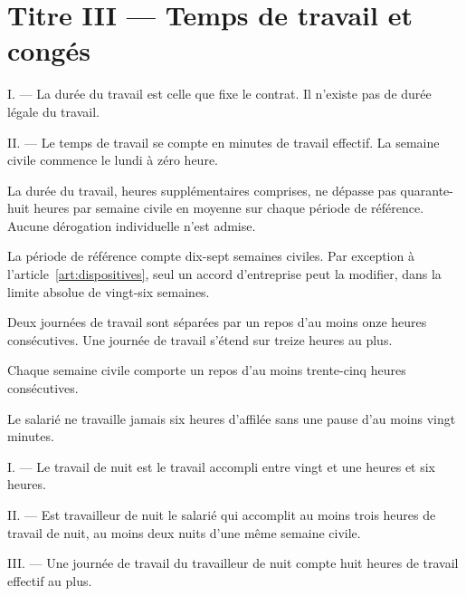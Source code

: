 \section{Titre III --- Temps de travail et congés}

\label{art:duree-travail}
I. --- La durée du travail est celle que fixe le contrat. Il n'existe pas de
durée légale du travail.

II. --- Le temps de travail se compte en minutes de travail effectif. La semaine
civile commence le lundi à zéro heure.

\label{art:duree-max}
La durée du travail, heures supplémentaires comprises, ne dépasse pas
quarante-huit heures par semaine civile en moyenne sur chaque période de
référence. Aucune dérogation individuelle n'est admise.

La période de référence compte dix-sept semaines civiles. Par exception à
l'article~\ref{art:dispositives}, seul un accord d'entreprise peut la modifier,
dans la limite absolue de vingt-six semaines.

Deux journées de travail sont séparées par un repos d'au moins onze heures
consécutives. Une journée de travail s'étend sur treize heures au plus.

Chaque semaine civile comporte un repos d'au moins trente-cinq heures
consécutives.

Le salarié ne travaille jamais six heures d'affilée sans une pause d'au moins
vingt minutes.

I. --- Le travail de nuit est le travail accompli entre vingt et une heures
et six heures.

II. --- Est travailleur de nuit le salarié qui accomplit au moins trois heures
de travail de nuit, au moins deux nuits d'une même semaine civile.

III. --- Une journée de travail du travailleur de nuit compte huit heures de
travail effectif au plus.

